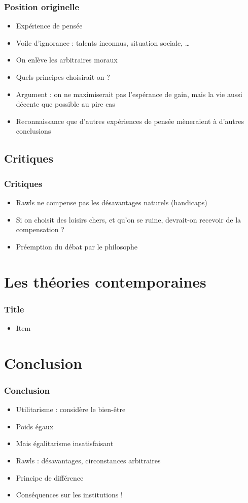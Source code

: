 \documentclass[french]{beamer}
\begin{document}
\begin{frame}
	\frametitle{Position originelle}
	\begin{itemize}
		\item Expérience de pensée
		\item Voile d’ignorance : talents inconnus, situation sociale, …
		\item On enlève les arbitraires moraux
		\item Quels principes choisirait-on ?
		\item Argument : on ne maximiserait pas l’espérance de gain, mais la vie aussi décente que possible au pire cas
		\item Reconnaissance que d’autres expériences de pensée mèneraient à d’autres conclusions
	\end{itemize}
\end{frame}

\subsection{Critiques}
\begin{frame}
	\frametitle{Critiques}
	\begin{itemize}
		\item Rawls ne compense pas les désavantages naturels (handicaps)
    \item Si on choisit des loisirs chers, et qu’on se ruine, devrait-on recevoir de la compensation ? 
    \item Préemption du débat par le philosophe \citep{estlund_democratic_2009}
	\end{itemize}
\end{frame}

\section{Les théories contemporaines}
\begin{frame}
	\frametitle{Title}
	\begin{itemize}
		\item Item
	\end{itemize}
\end{frame}

\section{Conclusion}
\begin{frame}
	\frametitle{Conclusion}
	\begin{itemize}
		\item Utilitarisme : considère le bien-être
		\item Poids égaux
		\item Mais égalitarisme insatisfaisant
		\item Rawls : désavantages, circonstances arbitraires
		\item Principe de différence
		\item Conséquences sur les institutions !
	\end{itemize}
\end{frame}
\end{document}
